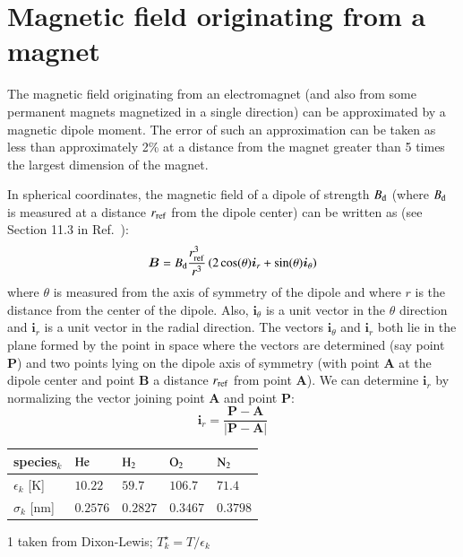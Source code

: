 \documentclass[oneside,10pt,onecolumn]{waflreport}
\renewcommand{\fontsizetable}{\footnotesize\scalefont{1.0}}
\renewcommand{\vec}[1]{\bm{#1}}
\newcommand{\Bdipole}{B_{\rm d}}
\begin{document}
\section{Magnetic field originating from a magnet}

The magnetic field originating from an electromagnet (and also from some permanent magnets
magnetized in a single direction) can be approximated by a magnetic dipole moment. The error
of such an approximation can be taken as less than approximately 2\% at a distance from
the magnet greater than 5 times the largest dimension of the magnet.

In spherical coordinates,
the magnetic field of a dipole of strength $\Bdipole$ (where $\Bdipole$ is measured
at a distance $r_{\rm ref}$ from the dipole center) can be written as
(see Section 11.3 in Ref.\ \cite{book:1985:purcell}):
%
\begin{equation}
  \vec{B}=\Bdipole\frac{r_{\rm ref}^3}{r^3} \left( 2 \cos (\theta) \vec{i}_r +\sin (\theta) \vec{i}_\theta  \right)
\end{equation}
%
where $\theta$ is measured from the axis of symmetry of the dipole and where $r$ is the distance
from the center of the dipole. Also, $\vec{i}_\theta$ is a unit vector in the $\theta$
direction and $\vec{i}_r$ is a unit vector in the radial direction. The vectors
$\vec{i}_\theta$ and $\vec{i}_r$ both lie in the plane formed by the point in space
where the vectors are determined (say point {$\vec{P}$}) and two points lying on
the dipole axis of symmetry (with point {$\vec{A}$} at the dipole center and point {$ \vec{B}$}
a distance $r_{\rm ref}$ from point {$ \vec{A}$}). We can determine $\vec{i}_r$ by normalizing
the vector joining point {$\vec{A}$} and point {$\vec{P}$}:
%
\begin{equation}
\vec{i}_r=\frac{\vec{P}-\vec{A}}{|\vec{P}-\vec{A}|}
\end{equation}
%
\begin{table}[ht]
\fontsizetable
\begin{center}
  \begin{threeparttable}
    \fontsizetable
    \begin{tabular}{lllll}
      \toprule
species$_k$     &  ${\rm He}$    &  ${\rm H}_2$   &  ${\rm O}_2$   &  ${\rm N}_2$  \\
\midrule
$\epsilon_k$ [K]&  $10.22$       &  $59.7$        &  $106.7$       &  $71.4$       \\
$\sigma_k$ [nm] &  $0.2576$      &  $0.2827$      &  $0.3467$      &  $0.3798$     \\
      \bottomrule
    \end{tabular}
    \label{table:species-epssig}
    \begin{tablenotes}
      \item [1] taken from Dixon-Lewis; $T^\star_k=T/ \epsilon_k$
    \end{tablenotes}
  \end{threeparttable}
\end{center}
\end{table}
\end{document}
